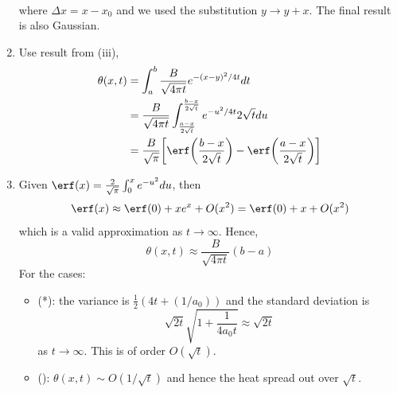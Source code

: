 \documentclass[a4paper]{article}
\begin{document}
\begin{ans}
\begin{enumerate}[label=(\roman*)]
\begin{align}
\end{align}
where $\Delta x=x-x_0$ and we used the substitution $y\rightarrow y+x$. The final result is also Gaussian.
\item Use result from (iii),
\begin{align}
\theta(x,t)&=\int_a^b\frac{B}{\sqrt{4\pi t}}e^{-(x-y)^2/4t}dt\nonumber\\&=\frac{B}{\sqrt{4\pi t}}\int_{\frac{a-x}{2\sqrt{t}}}^{\frac{b-x}{2\sqrt{t}}}e^{-u^2/4t}2\sqrt{t}du\nonumber\\&=\frac{B}{\sqrt{\pi}}\bigg[\erf\bigg(\frac{b-x}{2\sqrt{t}}\bigg)-\erf\bigg(\frac{a-x}{2\sqrt{t}}\bigg)\bigg]\nonumber
\end{align}
\item 
Given $\erf(x)=\frac{2}{\sqrt{\pi}}\int_0^xe^{-u^2}du$, then
$$\erf(x)\approx\erf(0)+xe^x+O(x^2)=\erf(0)+x+O(x^2)$$
which is a valid approximation as $t\rightarrow\infty$. Hence, $$\theta(x,t)\approx\frac{B}{\sqrt{4\pi t}}(b-a)$$
For the cases:
\begin{itemize}
    \item (*): the variance is $\frac{1}{2}(4t+(1/a_0))$ and the standard deviation is
    $$\sqrt{2t}\sqrt{1+\frac{1}{4a_0t}}\approx\sqrt{2t}$$
    as $t\rightarrow\infty$. This is of order $O(\sqrt{t})$.
    \item (\dag): $\theta(x,t)\sim O(1/\sqrt{t})$ and hence the heat spread out over $\sqrt{t}$.
\end{itemize}
\end{enumerate}
\end{ans}
\newpage
\end{document}
